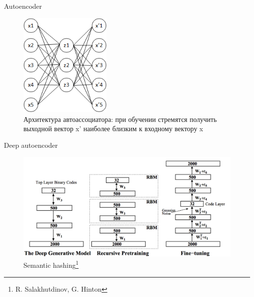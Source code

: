 \documentclass[10pt]{beamer}
\begin{document}
\begin{frame}{Autoencoder}

\begin{figure}[h!]
  \centering
  \includegraphics[width=0.4\textwidth]{images/ae.png}
  \caption{Архитектура автоассоциатора: при обучении стремятся получить выходной вектор x' наиболее близким к входному вектору x}
\end{figure}

\end{frame}


\begin{frame}{Deep autoencoder}

\begin{figure}[h!]
  \centering
  \includegraphics[width=1\textwidth]{images/dae.png}
  \caption{Semantic hashing\footnote{R. Salakhutdinov, G. Hinton}}
\end{figure}

\end{frame}
\end{document}
